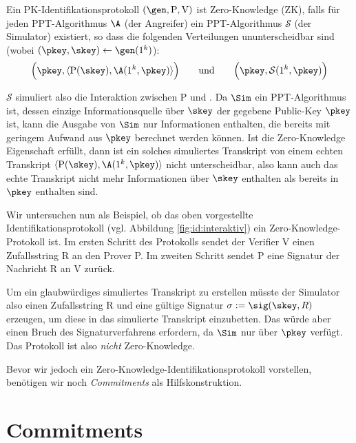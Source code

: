 \begin{definition}
  \label{def:zk}
  Ein PK-Identifikationsprotokoll $(\gen, \mathrm{P}, \mathrm{V})$ ist
  Zero-Knowledge (ZK), falls für jeden PPT-Algorithmus $\A$ (der
  Angreifer) ein PPT-Algorithmus $\mathcal{S}$ (der Simulator) existiert,
  so dass die folgenden Verteilungen ununterscheidbar sind (wobei
  $(\pkey, \skey) \leftarrow \gen(1^k)$):
  \[
    \Big(\pkey, \langle \mathrm{P}(\skey), \A(1^k, \pkey) \rangle\Big) \text{\qquad{}und\qquad{}} \Big(\pkey, \mathcal{S}(1^k, \pkey)\Big)
  \]
\end{definition}

$\mathcal{S}$ simuliert also die Interaktion zwischen P und \A. Da
$\Sim$ ein PPT-Algorithmus ist, dessen einzige Informationsquelle über
$\skey$ der gegebene Public-Key $\pkey$ ist, kann die Ausgabe von $\Sim$
nur Informationen enthalten, die bereits mit geringem Aufwand aus
$\pkey$ berechnet werden können. Ist die Zero-Knowledge Eigenschaft
erfüllt, dann ist ein solches simuliertes Transkript von einem echten
Transkript $\langle \mathrm{P}(\skey), \A(1^k, \pkey) \rangle$ nicht
unterscheidbar, also kann auch das echte Transkript nicht mehr
Informationen über $\skey$ enthalten als bereits in $\pkey$ enthalten
sind.

Wir untersuchen nun als Beispiel, ob das oben vorgestellte
Identifikationsprotokoll (vgl. Abbildung \ref{fig:id:interaktiv}) ein
Zero-Knowledge-Protokoll ist. Im ersten Schritt des Protokolls sendet
der Verifier V einen Zufallsstring R an den Prover P. Im zweiten Schritt
sendet P eine Signatur der Nachricht R an V zurück.

Um ein glaubwürdiges simuliertes Transkript zu erstellen müsste der
Simulator also einen Zufallsstring R und eine gültige Signatur $\sigma
:= \sig(\skey, R)$ erzeugen, um diese in das simulierte Transkript
einzubetten. Das würde aber einen Bruch des Signaturverfahrens
erfordern, da $\Sim$ nur über $\pkey$ verfügt. Das Protokoll ist also
\emph{nicht} Zero-Knowledge.

Bevor wir jedoch ein Zero-Knowledge-Identifikationsprotokoll vorstellen,
benötigen wir noch \emph{Commitments} als Hilfskonstruktion.
\section{Commitments}

